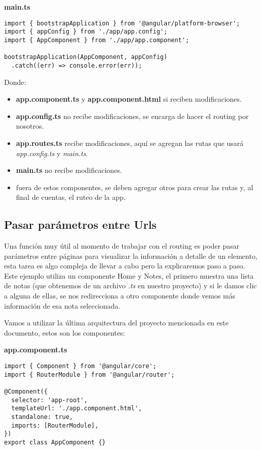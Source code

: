 \textbf{main.ts}
\begin{lstlisting}[style=htmlcssjs]
import { bootstrapApplication } from '@angular/platform-browser';
import { appConfig } from './app/app.config';
import { AppComponent } from './app/app.component';

bootstrapApplication(AppComponent, appConfig)
  .catch((err) => console.error(err));
\end{lstlisting}

Donde:
\begin{itemize}
    \item \textbf{app.component.ts} y \textbf{app.component.html} si reciben modificaciones.
    \item \textbf{app.config.ts} no recibe modificaciones, se encarga de hacer el routing por nosotros.
    \item \textbf{app.routes.ts} recibe modificaciones, aquí se agregan las rutas que usará \textit{app.config.ts} y \textit{main.ts}.
    \item \textbf{main.ts} no recibe modificaciones.
    \item fuera de estos componentes, se deben agregar otros para crear las rutas y, al final de cuentas, el ruteo de la app.
\end{itemize}


\subsection{Pasar parámetros entre Urls}

Una función muy útil al momento de trabajar con el routing es poder pasar parámetros entre páginas para visualizar la información a detalle de un elemento, esta tarea es algo compleja de llevar a cabo pero la explicaremos paso a paso. Este ejemplo utiliza un componente Home y Notes, el primero muestra una lista de notas (que obtenemos de un archivo \textit{.ts} en nuestro proyecto) y si le damos clic a alguna de ellas, se nos redirecciona a otro componente donde vemos más información de esa nota seleccionada.

Vamos a utilizar la última arquitectura del proyecto mencionada en este documento, estos son los componentes:

\textbf{app.component.ts}
\begin{lstlisting}[style=htmlcssjs]
import { Component } from '@angular/core';
import { RouterModule } from '@angular/router';

@Component({
  selector: 'app-root',
  templateUrl: './app.component.html',
  standalone: true,
  imports: [RouterModule],
})
export class AppComponent {}
\end{lstlisting}

